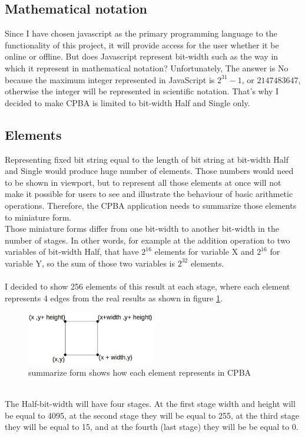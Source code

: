 \documentclass[11pt]{article}
\begin{document}
\subsection{Mathematical notation}
Since I have chosen javascript as the primary programming language to the functionality of this project, it will provide access for the user whether it be online or offline. But does Javascript represent bit-width such as the way in which it represent in mathematical notation? Unfortunately, The answer is No because the maximum integer represented in JavaScript is $2^{31} -1$, or $2147483647$, otherwise the integer will be represented in scientific notation. That's why I decided to make CPBA is limited to bit-width Half and Single only.
\subsection{Elements}
Representing fixed bit string equal to the length of bit string at bit-width Half and Single would produce huge number of elements. Those numbers would need to be shown in viewport, but to represent all those elements at once will not make it possible for users to see and illustrate the behaviour of basic arithmetic operations. Therefore, the CPBA application needs to summarize those elements to miniature form.\\
Those miniature forms differ from one bit-width to another bit-width in the number of stages. In other words, for example at the addition operation to two variables of bit-width Half, that have $2^{16}$ elements for variable X and $2^{16}$ for variable Y, so the sum of those two variables is $2^{32}$ elements.\\\\
I decided to show 256 elements of this result at each stage, where each element represents 4 edges from the real results as shown in figure \ref{edges}.\\
\begin{figure}[h]
    \centering
    \includegraphics[width=0.5\textwidth]{edges}
    \caption{summarize form shows how each element represents in CPBA}
    \label{edges}
\end{figure}\\
The Half-bit-width will have four stages. At the first stage width and height will be equal to 4095, at the second stage they will be equal to 255, at the third stage they will be equal to 15,  and at the fourth (last stage) they will be be equal to 0.\\\\
\end{document}
